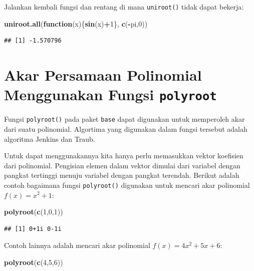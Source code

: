 \documentclass[]{book}
\newenvironment{Shaded}{\begin{snugshade}}{\end{snugshade}}
\newcommand{\ControlFlowTok}[1]{\textcolor[rgb]{0.13,0.29,0.53}{\textbf{#1}}}
\newcommand{\DecValTok}[1]{\textcolor[rgb]{0.00,0.00,0.81}{#1}}
\newcommand{\KeywordTok}[1]{\textcolor[rgb]{0.13,0.29,0.53}{\textbf{#1}}}
\newcommand{\NormalTok}[1]{#1}
\newcommand{\OperatorTok}[1]{\textcolor[rgb]{0.81,0.36,0.00}{\textbf{#1}}}
\theoremstyle{definition}
\theoremstyle{definition}
\theoremstyle{definition}
\theoremstyle{remark}
\begin{document}
Jalankan kembali fungsi dan rentang di mana \texttt{uniroot()} tidak dapat bekerja:

\begin{Shaded}
\begin{Highlighting}[]
\KeywordTok{uniroot.all}\NormalTok{(}\ControlFlowTok{function}\NormalTok{(x)\{}\KeywordTok{sin}\NormalTok{(x)}\OperatorTok{+}\DecValTok{1}\NormalTok{\}, }\KeywordTok{c}\NormalTok{(}\OperatorTok{-}\NormalTok{pi,}\DecValTok{0}\NormalTok{))}
\end{Highlighting}
\end{Shaded}

\begin{verbatim}
## [1] -1.570796
\end{verbatim}

\hypertarget{akar-persamaan-polinomial-menggunakan-fungsi-polyroot}{%
\section{\texorpdfstring{Akar Persamaan Polinomial Menggunakan Fungsi \texttt{polyroot}}{Akar Persamaan Polinomial Menggunakan Fungsi polyroot}}\label{akar-persamaan-polinomial-menggunakan-fungsi-polyroot}}

Fungsi \texttt{polyroot()} pada paket \texttt{base} dapat digunakan untuk memperoleh akar dari suatu polinomial. Algortima yang digunakan dalam fungsi tersebut adalah algoritma Jenkins dan Traub.

Untuk dapat menggunakannya kita hanya perlu memasukkan vektor koefisien dari polinomial. Pengisian elemen dalam vektor dimulai dari variabel dengan pangkat tertinggi menuju variabel dengan pangkat terendah. Berikut adalah contoh bagaimana fungsi \texttt{polyroot()} digunakan untuk mencari akar polinomial \(f\left(x\right)=x^2+1\):

\begin{Shaded}
\begin{Highlighting}[]
\KeywordTok{polyroot}\NormalTok{(}\KeywordTok{c}\NormalTok{(}\DecValTok{1}\NormalTok{,}\DecValTok{0}\NormalTok{,}\DecValTok{1}\NormalTok{))}
\end{Highlighting}
\end{Shaded}

\begin{verbatim}
## [1] 0+1i 0-1i
\end{verbatim}

Contoh lainnya adalah mencari akar polinomial \(f\left(x\right)=4x^2+5x+6\):

\begin{Shaded}
\begin{Highlighting}[]
\KeywordTok{polyroot}\NormalTok{(}\KeywordTok{c}\NormalTok{(}\DecValTok{4}\NormalTok{,}\DecValTok{5}\NormalTok{,}\DecValTok{6}\NormalTok{))}
\end{Highlighting}
\end{Shaded}
\end{document}
